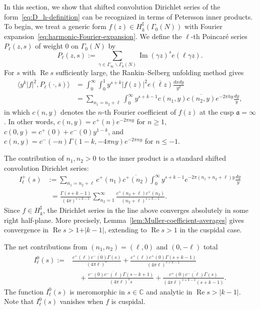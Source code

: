 \documentclass[11pt,reqno]{amsart}
\theoremstyle{plain}
\theoremstyle{definition}
\numberwithin{equation}{section}
\renewcommand{\Im}{\operatorname{Im}}
\renewcommand{\Re}{\operatorname{Re}}
\begin{document}
In this section, we show that shifted convolution Dirichlet series of the form~\eqref{eq:D_h-definition} can be recognized in terms of Petersson inner products. To begin, we treat a generic form $f(z) \in H_k^\sharp(\Gamma_0(N))$ with Fourier expansion~\eqref{eq:harmonic-Fourier-expansion}. We define the $\ell$-th Poincar\'e series $P_\ell(z,s)$ of weight $0$ on $\Gamma_0(N)$ by
\[
	P_\ell(z,s) := \sum_{\gamma \in \Gamma_\infty \backslash \Gamma_0(N)} \Im(\gamma z)^s e(\ell \gamma z).
\]
For $s$ with $\Re s$ sufficiently large, the Rankin--Selberg unfolding method gives
\begin{align} \label{eq:Poincare-unfolding}
\langle y^{k} \vert f \vert^2, P_\ell(\cdot, \overline{s}) \rangle
	&= \int_0^\infty \int_0^1 
		y^{s+k} \vert f(z) \vert^2 \overline{e(\ell z)} \frac{dxdy}{y^2} \\
	&= \sum_{n_1 = n_2 +\ell} \int_0^\infty y^{s+k-1} c(n_1,y) \overline{c(n_2,y)} e^{-2\pi h y} \frac{dy}{y},
\end{align}
in which $c(n,y)$ denotes the $n$-th Fourier coefficient of $f(z)$ at the cusp $\mathfrak{a} = \infty$. In other words, $c(n,y) = c^+(n) e^{-2\pi n y}$ for $n \geq 1$, $c(0,y) = c^+(0) + c^-(0) y^{1-k}$, and $c(n,y) = c^-(-n) \Gamma(1-k,-4\pi n y) e^{-2\pi n y}$ for $n \leq -1$.

The contribution of $n_1, n_2 > 0$ to the inner product is a standard shifted convolution Dirichlet series:
\begin{align*}
I_\ell^+(s) &:=	\!\! \sum_{n_1=n_2+\ell} \!\!
	c^+(n_1) \overline{c^+(n_2)} \int_0^\infty y^{s+k-1} e^{-2\pi (n_1+n_2+\ell) y} \frac{dy}{y} \\
	&\phantom{:}= \frac{\Gamma(s+k-1)}{(4\pi)^{s+k-1}}
		\sum_{n_2 =1}^\infty \frac{c^+(n_2+\ell)\overline{c^+(n_2)}}{(n_2+\ell)^{s+k-1}}.
\end{align*}
Since $f \in H_k^\sharp$, the Dirichlet series in the line above converges absolutely in some right half-plane. More precisely, Lemma~\ref{lem:Muller-coefficient-averages} gives convergence in $\Re s > 1 + \vert k-1 \vert$, extending to $\Re s > 1$ in the cuspidal case.

The net contributions from $(n_1,n_2) = (\ell,0)$ and $(0,-\ell)$ total
\begin{align} \label{eq:I_h^0-definition}
	I_\ell^0(s) :=& \frac{c^+(\ell) \overline{c^-(0)} \Gamma(s)}{(4\pi \ell)^s}
		+ \frac{c^+(\ell) \overline{c^+(0)} \Gamma(s+k-1)}{(4\pi \ell)^{s+k-1}} \\
	&\quad + \frac{c^-(0) \overline{c^-(\ell)}\Gamma(s-k+1)}{(4\pi \ell)^s s} 
		+ \frac{c^+(0) \overline{c^-(\ell)} \Gamma(s)}{(4\pi \ell)^{s+k-1} (s+k-1)}.
\end{align}
The function $I_\ell^0(s)$ is meromorphic in $s \in \mathbb{C}$ and analytic in $\Re s > \vert k-1\vert$. Note that $I_\ell^0(s)$ vanishes when $f$ is cuspidal.
\end{document}
